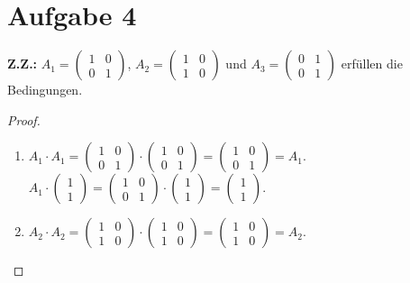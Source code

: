 \documentclass{article}
\begin{document}
    \section*{Aufgabe 4}
    \textbf{Z.Z.:} $A_1 = \begin{pmatrix}1&0\\0&1\end{pmatrix}$, 
        $A_2 = \begin{pmatrix}1&0\\1&0\end{pmatrix}$ und
        $A_3 = \begin{pmatrix}0&1\\0&1\end{pmatrix}$ erfüllen die Bedingungen.
    \begin{proof}\ 
        \begin{enumerate}
            \item $A_1 \cdot A_1 = \begin{pmatrix}1&0\\0&1\end{pmatrix} \cdot \begin{pmatrix}1&0\\0&1\end{pmatrix} = \begin{pmatrix}1&0\\0&1\end{pmatrix} = A_1$.\\
            $A_1 \cdot \begin{pmatrix} 1\\1\end{pmatrix} = \begin{pmatrix}1&0\\0&1\end{pmatrix} \cdot \begin{pmatrix}1\\1\end{pmatrix} = \begin{pmatrix}1\\1\end{pmatrix}$.
            \item $A_2 \cdot A_2 = \begin{pmatrix}1&0\\1&0\end{pmatrix} \cdot \begin{pmatrix}1&0\\1&0\end{pmatrix} = \begin{pmatrix}1&0\\1&0\end{pmatrix} = A_2$.\\

\end{enumerate}
\end{proof}
\end{document}
